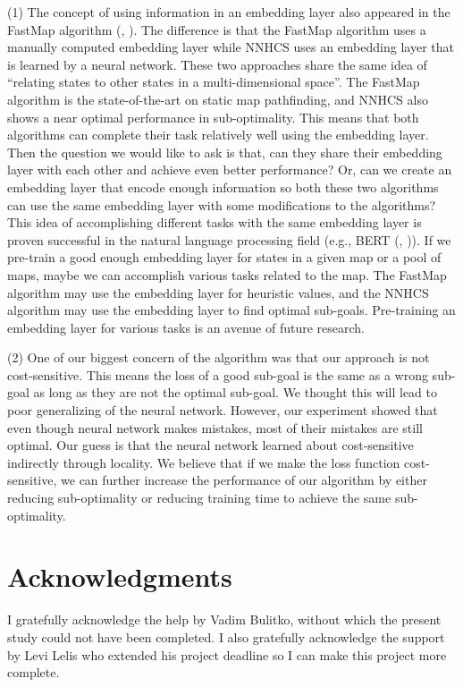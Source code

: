 \documentclass[letterpaper]{article}
\newcommand{\citea}[1]{(\citeauthor{#1}, \citeyear{#1})}
\numberwithin{equation}{section}
\numberwithin{theorem}{section}
\numberwithin{lemma}{section}
\numberwithin{df}{section}
\begin{document}
    (1) The concept of using information in an embedding layer also appeared in the FastMap algorithm \citea{fastmap}.
    The difference is that the FastMap algorithm uses a manually computed embedding layer while NNHCS uses an embedding layer that is learned by a neural network.
    These two approaches share the same idea of ``relating states to other states in a multi-dimensional space''.
    The FastMap algorithm is the state-of-the-art on static map pathfinding, and NNHCS also shows a near optimal performance in sub-optimality.
    This means that both algorithms can complete their task relatively well using the embedding layer.
    Then the question we would like to ask is that, can they share their embedding layer with each other and achieve even better performance?
    Or, can we create an embedding layer that encode enough information so both these two algorithms can use the same embedding layer with some modifications to the algorithms?
    This idea of accomplishing different tasks with the same embedding layer is proven successful in the natural language processing field (e.g., BERT \citea{bert}).
    If we pre-train a good enough embedding layer for states in a given map or a pool of maps, maybe we can accomplish various tasks related to the map.
    The FastMap algorithm may use the embedding layer for heuristic values, and the NNHCS algorithm may use the embedding layer to find optimal sub-goals.
    Pre-training an embedding layer for various tasks is an avenue of future research.

    (2) One of our biggest concern of the algorithm was that our approach is not cost-sensitive.
    This means the loss of a good sub-goal is the same as a wrong sub-goal as long as they are not the optimal sub-goal.
    We thought this will lead to poor generalizing of the neural network.
    However, our experiment showed that even though neural network makes mistakes, most of their mistakes are still optimal.
    Our guess is that the neural network learned about cost-sensitive indirectly through locality.
    We believe that if we make the loss function cost-sensitive,
    we can further increase the performance of our algorithm by either reducing sub-optimality or reducing training time to achieve the same sub-optimality.

    \newpage

    \section*{Acknowledgments}

    I gratefully acknowledge the help by Vadim Bulitko, without which the present study could not have been completed.
    I also gratefully acknowledge the support by Levi Lelis who extended his project deadline so I can make this project more complete.

    
    
\end{document}
